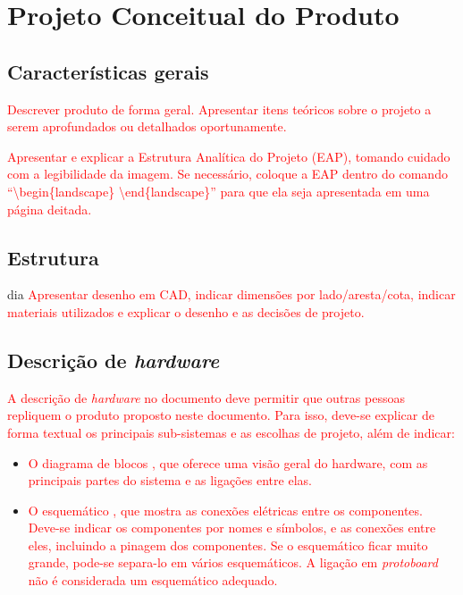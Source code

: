 \chapter{Projeto Conceitual do Produto}

\section{Características gerais}

\textcolor{red}{Descrever produto de forma geral. Apresentar itens teóricos sobre o projeto a serem aprofundados ou detalhados oportunamente.}

\textcolor{red}{Apresentar e explicar a Estrutura Analítica do Projeto (EAP), tomando cuidado com a legibilidade da imagem. Se necessário, coloque a EAP dentro do comando ``\textsf{\textbackslash begin\{landscape\} \textbackslash end\{landscape\}}'' para que ela seja apresentada em uma página deitada.}

\section{Estrutura}
dia
\textcolor{red}{Apresentar desenho em CAD, indicar dimensões por lado/aresta/cota, indicar materiais utilizados e explicar o desenho e as decisões de projeto.}

\section{Descrição de \textit{hardware}}

\textcolor{red}{A descrição de \textit{hardware} no documento deve permitir que outras pessoas repliquem o produto proposto neste documento. Para isso, deve-se explicar de forma textual os principais sub-sistemas e as escolhas de projeto, além de indicar:}

\begin{itemize}
    \item \textcolor{red}{ O diagrama de blocos \cite{blockdiagram}, que oferece uma visão geral do hardware, com as principais partes do sistema e as ligações entre elas.}
    \item \textcolor{red}{ O esquemático \cite{esquematico}, que mostra as conexões elétricas entre os componentes. Deve-se indicar os componentes por nomes e símbolos, e as conexões entre eles, incluindo a pinagem dos componentes. Se o esquemático ficar muito grande, pode-se separa-lo em vários esquemáticos. A ligação em \textit{protoboard} não é considerada um esquemático adequado.}
\end{itemize}

